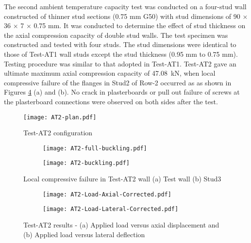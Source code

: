 The second ambient temperature capacity test was conducted on a four-stud wall constructed of thinner stud sections (0.75 mm G50) with stud dimensions of 90 $\times$ 36 $\times$ 7 $\times$ 0.75 mm. It was conducted to determine the effect of stud thickness on the axial compression capacity of double stud walls. The test specimen was constructed and tested with four studs. The stud dimensions were identical to those of Test-AT1 wall studs except the stud thickness (0.95 mm to 0.75 mm). Testing procedure was similar to that adopted in Test-AT1. Test-AT2 gave an ultimate maximum axial compression capacity of 47.08~kN, when local compressive failure of the flanges in Stud2 of Row-2 occurred as as shown in Figures \ref{fig:AT2-failure} (a) and (b). No crack in plasterboards or pull out failure of screws at the plasterboard connections were observed on both sides after the test.  
\begin{figure}[!htbp]
	\centering
			\texttt{[image: AT2-plan.pdf]}\\
		\caption{Test-AT2 configuration}
		\label{fig:AT2-plan}
\end{figure}  
\begin{figure}[!htbp]
	\centering
	\begin{subfigure}[b]{0.4\textwidth}
		\centering
		\texttt{[image: AT2-full-buckling.pdf]}
		\caption{}
		\label{subfig:AT2-full-buckling}
	\end{subfigure}
	\begin{subfigure}[b]{0.4\textwidth}
		\centering
		\texttt{[image: AT2-buckling.pdf]}
		\caption{}
		\label{subfig:AT2-buckling}
	\end{subfigure}
	   \caption{Local compressive failure in Test-AT2 wall (a) Test wall (b) Stud3}
	   \label{fig:AT2-failure}
\end{figure}
\begin{figure}[!htbp]
	\centering
	\begin{subfigure}[b]{0.45\textwidth}
		\centering
		\texttt{[image: AT2-Load-Axial-Corrected.pdf]}
		\caption{}
		\label{subfig:AT2-Load-Axial-Corrected}
	\end{subfigure}
	\begin{subfigure}[b]{0.45\textwidth}
		\centering
		\texttt{[image: AT2-Load-Lateral-Corrected.pdf]}
		\caption{}
		\label{subfig:AT2-Load-Lateral-Corrected}
	\end{subfigure}
	   \caption{Test-AT2 results - (a) Applied load versus axial displacement and (b) Applied load versus lateral deflection}
	   \label{fig:AT2-results}
\end{figure}
